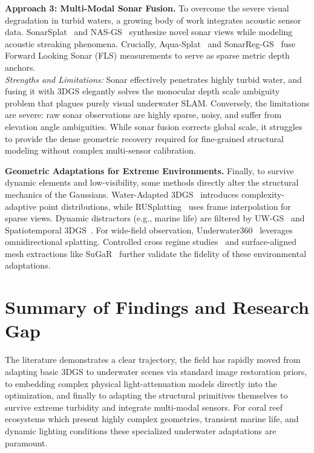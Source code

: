 \textbf{Approach 3: Multi-Modal Sonar Fusion.}
To overcome the severe visual degradation in turbid waters, a growing body of work integrates acoustic sensor data. SonarSplat~\cite{11223217} and NAS-GS~\cite{xu2026nasgsnoiseawaresonargaussian} synthesize novel sonar views while modeling acoustic streaking phenomena. Crucially, Aqua-Splat~\cite{11184160} and SonarReg-GS~\cite{s26154713} fuse Forward Looking Sonar (FLS) measurements to serve as sparse metric depth anchors.
\\ \textit{Strengths and Limitations:} Sonar effectively penetrates highly turbid water, and fusing it with 3DGS elegantly solves the monocular depth scale ambiguity problem that plagues purely visual underwater SLAM. Conversely, the limitations are severe: raw sonar observations are highly sparse, noisy, and suffer from elevation angle ambiguities. While sonar fusion corrects global scale, it struggles to provide the dense geometric recovery required for fine-grained structural modeling without complex multi-sensor calibration.

\textbf{Geometric Adaptations for Extreme Environments.} 
Finally, to survive dynamic elements and low-visibility, some methods directly alter the structural mechanics of the Gaussians. Water-Adapted 3DGS~\cite{10.3389/fmars.2025.1573612} introduces complexity-adaptive point distributions, while RUSplatting~\cite{jiang2025rusplattingrobust3dgaussian} uses frame interpolation for sparse views. Dynamic distractors (e.g., marine life) are filtered by UW-GS~\cite{10943785} and Spatiotemporal 3DGS~\cite{Liu_2025}. For wide-field observation, Underwater360~\cite{hu2026underwater360reconstructingunderwaterscenes} leverages omnidirectional splatting. Controlled cross regime studies~\cite{alvarez2026gaussiansplattingunderwatercontrolled} and surface-aligned mesh extractions like SuGaR~\cite{guedon2024sugar} further validate the fidelity of these environmental adaptations.

\section{Summary of Findings and Research Gap}
The literature demonstrates a clear trajectory, the field has rapidly moved from adapting basic 3DGS to underwater scenes via standard image restoration priors, to embedding complex physical light-attenuation models directly into the optimization, and finally to adapting the structural primitives themselves to survive extreme turbidity and integrate multi-modal sensors. For coral reef ecosystems which present highly complex geometries, transient marine life, and dynamic lighting conditions these specialized underwater adaptations are paramount. 

